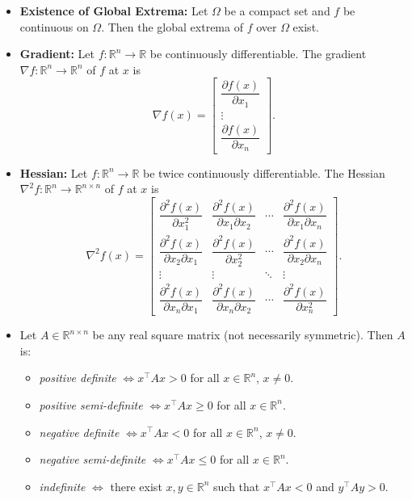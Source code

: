 \documentclass[12pt]{article}
\begin{document}
\begin{itemize}
  \item \textbf{Existence of Global Extrema:} Let $\Omega$ be a compact set and $f$ be continuous on $\Omega$. Then the global extrema of $f$ over $\Omega$ exist.
  \item \textbf{Gradient:} Let $f: \mathbb{R}^n \to \mathbb{R}$ be continuously differentiable. The gradient $\nabla f : \mathbb{R}^n \to \mathbb{R}^n$ of $f$ at $x$ is
  \[
    \nabla f(x) = \begin{bmatrix}
      \dfrac{\partial f(x)}{\partial x_1} \\
      \vdots \\
      \dfrac{\partial f(x)}{\partial x_n}
    \end{bmatrix}.
  \]
  \item \textbf{Hessian:} Let $f: \mathbb{R}^n \to \mathbb{R}$ be twice continuously differentiable. The Hessian $\nabla^2 f : \mathbb{R}^n \to \mathbb{R}^{n\times n}$ of $f$ at $x$ is
  \[
    \nabla^2 f(x)=\begin{bmatrix}
      \dfrac{\partial^2 f(x)}{\partial x_1^2} & \dfrac{\partial^2 f(x)}{\partial x_1\partial x_2} & \cdots & \dfrac{\partial^2 f(x)}{\partial x_1\partial x_n}\\
      \dfrac{\partial^2 f(x)}{\partial x_2\partial x_1} & \dfrac{\partial^2 f(x)}{\partial x_2^2} & \cdots & \dfrac{\partial^2 f(x)}{\partial x_2\partial x_n}\\
      \vdots & \vdots & \ddots & \vdots\\
      \dfrac{\partial^2 f(x)}{\partial x_n\partial x_1} & \dfrac{\partial^2 f(x)}{\partial x_n\partial x_2} & \cdots & \dfrac{\partial^2 f(x)}{\partial x_n^2}
    \end{bmatrix}.
  \]
  \item Let $A\in\mathbb{R}^{n\times n}$ be any real square matrix (not necessarily symmetric). Then $A$ is:
  \begin{itemize}
    \item \emph{positive definite} $\Leftrightarrow x^{\top}Ax>0$ for all $x\in\mathbb{R}^n$, $x\ne 0$.
    \item \emph{positive semi-definite} $\Leftrightarrow x^{\top}Ax\ge 0$ for all $x\in\mathbb{R}^n$.
    \item \emph{negative definite} $\Leftrightarrow x^{\top}Ax<0$ for all $x\in\mathbb{R}^n$, $x\ne 0$.
    \item \emph{negative semi-definite} $\Leftrightarrow x^{\top}Ax\le 0$ for all $x\in\mathbb{R}^n$.
    \item \emph{indefinite} $\Leftrightarrow$ there exist $x,y\in\mathbb{R}^n$ such that $x^{\top}Ax<0$ and $y^{\top}Ay>0$.

\end{itemize}
\end{itemize}
\end{document}
